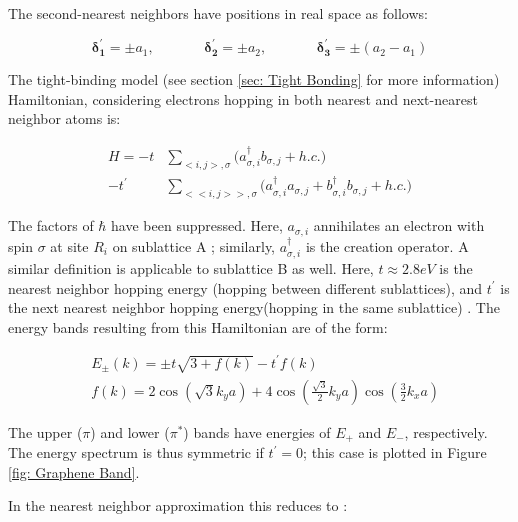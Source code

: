 \documentclass[]{article}
\begin{document}
The second-nearest neighbors have positions in real space as follows:

\begin{equation}
\mathbf{\delta^{'}_1} = \pm a_1, \ \ \ \ \ \ \ \ \ \ \ \ \ \ \ \ \mathbf{\delta^{'}_2} = \pm a_2, \ \ \ \  \ \ \ \ \ \ \ \ \ \ \ \ \mathbf{\delta^{'}_3} = \pm (a_2 - a_1)
\end{equation}

The tight-binding model (see section \ref{sec: Tight Bonding} for more information) Hamiltonian, considering electrons hopping in both nearest and next-nearest neighbor atoms is:

\begin{align}
	H  = -t &\sum_{<i,j>, \sigma} \bigg( a_{\sigma, i}^\dagger b_{\sigma, j} + h.c. \bigg )\\
	-t^{'} &\sum_{<<i,j>>, \sigma} \bigg( a_{\sigma, i}^\dagger a_{\sigma, j}  + b_{\sigma, i}^\dagger b_{\sigma, j} + h.c. \bigg )
\end{align}

The factors of $\hbar$ have been suppressed. Here, $a_{\sigma, i}$ annihilates an electron with spin $\sigma$ at site $R_i$ on sublattice A \cite{The_Electronic_Properties_of_Graphene}; similarly, $a_{\sigma, i}^\dagger$ is the creation operator. A similar definition is applicable to sublattice B as well. Here, $t \approx 2.8 eV$ is the nearest neighbor hopping energy (hopping between different sublattices), and $t^{'}$ is the next nearest neighbor hopping energy\footnotemark (hopping in the same sublattice) \cite{The_Electronic_Properties_of_Graphene}. The energy bands resulting from this Hamiltonian are of the form:


\begin{align}\label{eq:Full_Band_Equation}
	&E_{\pm}(k) = \pm t\sqrt{3+f(k)} -t^{'}f(k) \\
	&f(k) = 2\cos(\sqrt{3}k_y a) + 4\cos(\frac{\sqrt{3}}{2}k_y a)\cos(\frac{3}{2}k_x a)
\end{align}

The upper ($\pi$) and lower ($\pi^*$) bands have energies of $E_+$ and $E_-$, respectively. The energy spectrum is thus symmetric if $t^{'} = 0$; this case is plotted in Figure \ref{fig: Graphene Band}.
\newline

In the nearest neighbor approximation this reduces to \cite{Properties_of_graphene:_a_theoretical_perspective}:
\end{document}
